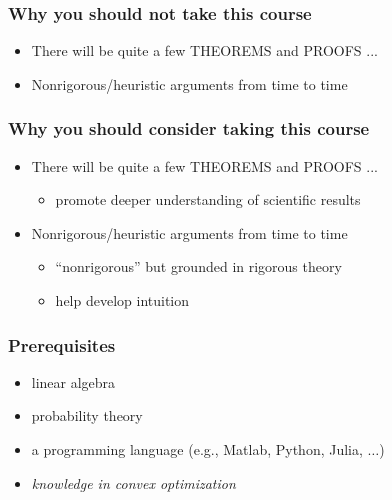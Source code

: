 \documentclass[compress,
mathserif,wide,%
]{beamer}
\begin{document}
\begin{frame}
\frametitle{Why you \alert{should not} take this course}


\begin{itemize}
  \itemsep1em
  \item<2-> There will be quite a few THEOREMS and PROOFS ...
  \pause
  \item<3-> Nonrigorous/heuristic arguments from time to time
\end{itemize}

\end{frame}






\begin{frame}
\frametitle{Why you \alert{should} consider taking this course}


\begin{itemize}
  \itemsep1em
  \item<2-> There will be quite a few THEOREMS and PROOFS ...
  \begin{itemize}
    \item<3-> promote deeper understanding of scientific results
  \end{itemize}
  
  \item<4-> Nonrigorous/heuristic arguments from time to time
  \begin{itemize}
    \vspace{0.5em}
    \item<5-> ``nonrigorous'' but grounded in rigorous theory
    \item<5-> help develop intuition
  \end{itemize}
  
\end{itemize}

\end{frame}

\begin{frame}
\frametitle{Prerequisites}



\begin{itemize}
  \itemsep0.5em
  \item linear algebra 
  \item probability theory
  \item a programming language (e.g., Matlab, Python, Julia, $\ldots$)
  \item {\em knowledge in convex optimization}
\end{itemize}



\end{frame}
\end{document}
